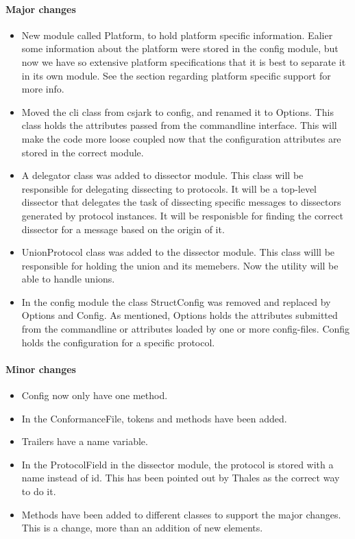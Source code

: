 \paragraph{Major changes}
\begin{itemize}
\item New module called Platform, to hold platform specific information. Ealier some information about the platform were stored in the config module, but now we have so extensive platform specifications that it is best to separate it in its own module. See the section regarding platform specific support for more info.
\item Moved the \gls{cli} class from csjark to config, and renamed it to Options. This class holds the attributes passed from the commandline interface. This will make the code more loose coupled now that the configuration attributes are stored in the correct module. 
\item A delegator class was added to dissector module. This class will be responsible for delegating dissecting to protocols. It will be a top-level dissector that delegates the task of dissecting specific messages to dissectors generated by protocol instances. It will be responisble for finding the correct dissector for a message based on the origin of it.
\item UnionProtocol class was added to the dissector module. This class willl be responsible for holding the union and its memebers. Now the utility will be able to handle unions. 
\item In the config module the class StructConfig was removed and replaced by Options and Config. As mentioned, Options holds the attributes submitted from the commandline or attributes loaded by one or more config-files. Config holds the configuration for a specific protocol.

\end{itemize}

\paragraph{Minor changes}
\begin{itemize}
\item Config now only have one method.
\item In the ConformanceFile, tokens and methods have been added.
\item Trailers have a name variable.
\item In the ProtocolField in the dissector module, the protocol is stored with a name instead of id. This has been pointed out by Thales as the correct way to do it.
\item Methods have been added to different classes to support the major changes. This is a change, more than an addition of new elements. 
\end{itemize}

